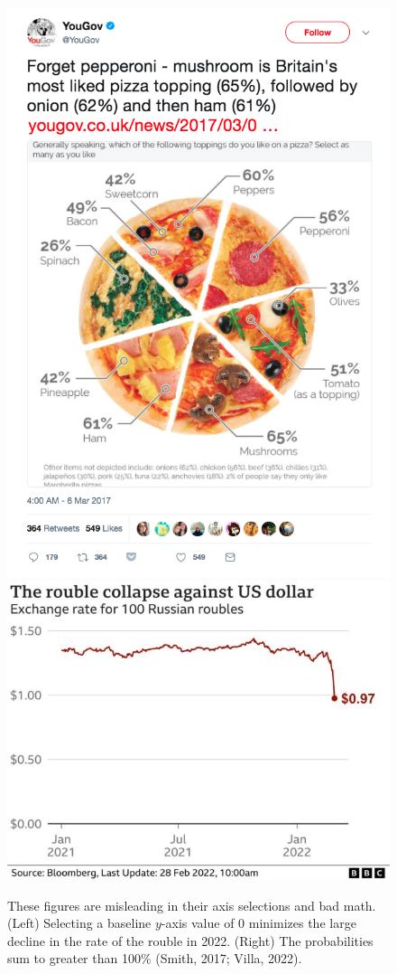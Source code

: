 \documentclass[print]{nuthesis}
\begin{document}
\begin{figure}[tbp]

{\centering \includegraphics[width=0.49\linewidth,]{images/misleading-graphics-pizza} \includegraphics[width=0.49\linewidth,]{images/misleading-graphics-bad-axes-rouble-to-dollar} 

}

\caption[Misleading bad axes]{These figures are misleading in their axis selections and bad math. (Left) Selecting a baseline $y$-axis value of 0 minimizes the large decline in the rate of the rouble in 2022. (Right) The probabilities sum to greater than 100\% (Smith, 2017; Villa, 2022).}\label{fig:misleading-graphics-bad-axes}
\end{figure}
\end{document}
